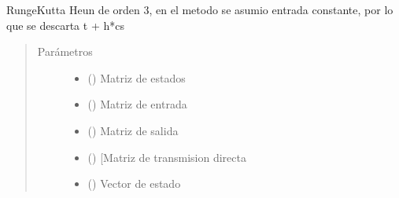 \documentclass[letterpaper,10pt,spanish]{sphinxmanual}
\begin{document}
\begin{fulllineitems}
\label{\detokenize{codigos/rk_generator:rk_generator.heun3}}
Runge\sphinxhyphen{}Kutta Heun de orden 3, en el metodo se asumio entrada constante, por lo que se descarta t + h*cs
\begin{quote}\begin{description}
\item[{Parámetros}] \leavevmode\begin{itemize}
\item {} 
 (\sphinxstyleliteralemphasis{\sphinxupquote{, }}\sphinxstyleliteralemphasis{\sphinxupquote{, }}) \textendash{} Matriz de estados

\item {} 
 (\sphinxstyleliteralemphasis{\sphinxupquote{, }}\sphinxstyleliteralemphasis{\sphinxupquote{, }}) \textendash{} Matriz de entrada

\item {} 
 (\sphinxstyleliteralemphasis{\sphinxupquote{, }}\sphinxstyleliteralemphasis{\sphinxupquote{, }}) \textendash{} Matriz de salida

\item {} 
 (\sphinxstyleliteralemphasis{\sphinxupquote{, }}\sphinxstyleliteralemphasis{\sphinxupquote{, }}) \textendash{} {[}Matriz de transmision directa

\item {} 
 (\sphinxstyleliteralemphasis{\sphinxupquote{, }}\sphinxstyleliteralemphasis{\sphinxupquote{, }}) \textendash{} Vector de estado


\end{itemize}
\end{description}
\end{quote}
\end{fulllineitems}
\end{document}
